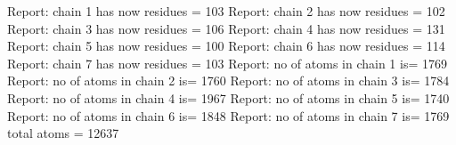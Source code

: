  Report: chain           1 has now residues =          103
 Report: chain           2 has now residues =          102
 Report: chain           3 has now residues =          106
 Report: chain           4 has now residues =          131
 Report: chain           5 has now residues =          100
 Report: chain           6 has now residues =          114
 Report: chain           7 has now residues =          103
 Report: no of atoms in chain           1 is=        1769
 Report: no of atoms in chain           2 is=        1760
 Report: no of atoms in chain           3 is=        1784
 Report: no of atoms in chain           4 is=        1967
 Report: no of atoms in chain           5 is=        1740
 Report: no of atoms in chain           6 is=        1848
 Report: no of atoms in chain           7 is=        1769
 total atoms =       12637
